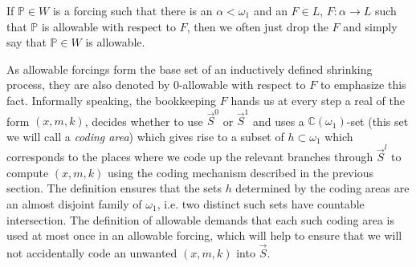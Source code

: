 \documentclass[a4paper,11pt]{article}
\newcommand{\forceP}{\mathbb{P}}
\begin{document}
If $\forceP \in W$ is a forcing such that there is an $\alpha < \omega_1$ and an $F \in L$, $F: \alpha \rightarrow L$ such that $\forceP$ is allowable with respect to $F$, then we often just drop the $F$ and simply say that $\forceP \in W$ is allowable. 

As allowable forcings form the base set of an inductively defined shrinking process, they are also denoted by 0-allowable with respect to $F$ to emphasize this fact.
Informally speaking, the bookkeeping $F$ hands us at every step a real of the form $(x,m,k)$, decides whether to use $\vec{S}^0$ or $\vec{S}^1$ and uses a $\mathbb{C}(\omega_1)$-set (this set we will call a \emph{coding area}) which gives rise to a subset of $h \subset \omega_1$ which corresponds to the places where we code up the relevant branches through $\vec{S}^l$ to compute $(x,m,k)$ using the coding mechanism described in the previous section. The definition ensures that the sets $h$ determined by the coding areas are an almost disjoint family of $\omega_1$, i.e. two distinct such sets have countable intersection. The definition of allowable demands that each such coding area is used at most once in an allowable forcing, which will help to ensure that we will not accidentally code an unwanted $(x,m,k)$ into $\vec{S}$. 
\end{document}
